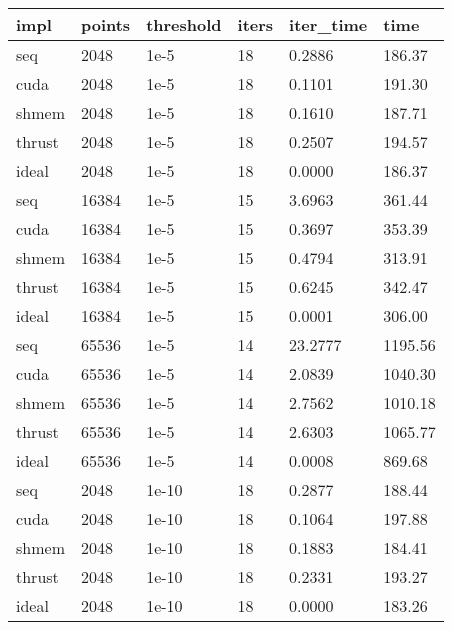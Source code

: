 \documentclass{article}
\begin{document}
\begin{center}
\begin{tabular}{|l|l|l|l|l|l|}
\hline
  \bf{impl} & \bf{points} & \bf{threshold} & \bf{iters} & \bf{iter\_time} & \bf{time} \\ \hline

seq &     2048 &       1e-5 &    18 &    0.2886 &  186.37 \\ \hline
cuda &    2048 &       1e-5 &    18 &    0.1101 &  191.30 \\ \hline
shmem &   2048 &       1e-5 &    18 &    0.1610 &  187.71 \\ \hline
thrust &  2048 &       1e-5 &    18 &    0.2507 &  194.57 \\ \hline
ideal &   2048 &       1e-5 &    18 &    0.0000 &  186.37 \\ \hline

seq &    16384 &       1e-5 &    15 &    3.6963 &  361.44 \\ \hline
cuda &   16384 &       1e-5 &    15 &    0.3697 &  353.39 \\ \hline
shmem &  16384 &       1e-5 &    15 &    0.4794 &  313.91 \\ \hline
thrust & 16384 &       1e-5 &    15 &    0.6245 &  342.47 \\ \hline
ideal &  16384 &       1e-5 &    15 &    0.0001 &  306.00 \\ \hline

seq &    65536 &       1e-5 &    14 &   23.2777 & 1195.56 \\ \hline
cuda &   65536 &       1e-5 &    14 &    2.0839 & 1040.30 \\ \hline
shmem &  65536 &       1e-5 &    14 &    2.7562 & 1010.18 \\ \hline
thrust & 65536 &       1e-5 &    14 &    2.6303 & 1065.77 \\ \hline
ideal &  65536 &       1e-5 &    14 &    0.0008 &  869.68 \\ \hline

seq &     2048 &      1e-10 &    18 &    0.2877 &  188.44 \\ \hline
cuda &    2048 &      1e-10 &    18 &    0.1064 &  197.88 \\ \hline
shmem &   2048 &      1e-10 &    18 &    0.1883 &  184.41 \\ \hline
thrust &  2048 &      1e-10 &    18 &    0.2331 &  193.27 \\ \hline
ideal &   2048 &      1e-10 &    18 &    0.0000 &  183.26 \\ \hline


\end{tabular}
\end{center}
\end{document}
